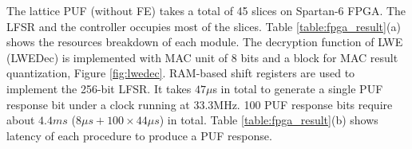 


The lattice PUF (without FE) takes a total of 45 slices on Spartan-6 FPGA. The LFSR and the controller occupies most of the slices. Table %
\ref{table:fpga_result}(a) shows the resources breakdown of each module. The decryption function of LWE (LWEDec) is implemented with MAC unit of 8 bits and a block for MAC result quantization, Figure \ref{fig:lwedec}.
RAM-based shift registers are used to implement the 256-bit LFSR. It takes $47\mu$s in total to generate a single PUF response bit under a clock running at 33.3MHz. 100 PUF response bits require about $4.4ms$ ($8\mu s + 100\times 44\mu s$) in total. Table %
\ref{table:fpga_result}(b) shows latency of each procedure to produce a PUF response.

